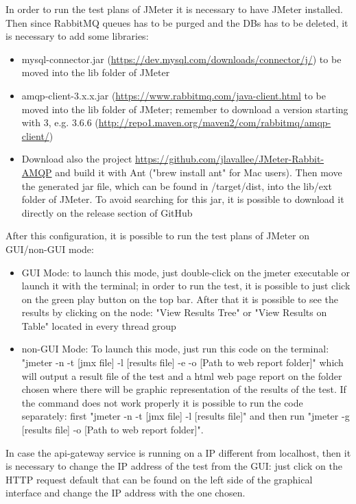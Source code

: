 \par
In order to run the test plans of JMeter it is necessary to have JMeter installed. Then since RabbitMQ queues has to be purged and the DBs has to be deleted, it is necessary to add some libraries:
\begin{itemize}
\item mysql-connector.jar (\url{https://dev.mysql.com/downloads/connector/j/}) to be moved into the lib folder of JMeter
\item amqp-client-3.x.x.jar (\url{https://www.rabbitmq.com/java-client.html} to be moved into the lib folder of JMeter; remember to download a version starting with 3, e.g. 3.6.6 (\url{http://repo1.maven.org/maven2/com/rabbitmq/amqp-client/})
\item Download also the project \url{https://github.com/jlavallee/JMeter-Rabbit-AMQP} and build it with Ant ("brew install ant" for Mac users). Then move the generated jar file, which can be found in /target/dist, into the lib/ext folder of JMeter. To avoid searching for this jar, it is possible to download it directly on the release section of GitHub
\end{itemize}
After this configuration, it is possible to run the test plans of JMeter on GUI/non-GUI mode: 
\begin{itemize}
	\item GUI Mode: to launch this mode, just double-click on the jmeter executable or launch it with the terminal; in order to run the test, it is possible to just click on the green play button on the top bar. After that it is possible to see the results by clicking on the node: "View Results Tree" or "View Results on Table" located in every thread group
	\item non-GUI Mode: To launch this mode, just run this code on the terminal: "jmeter -n -t [jmx file] -l [results file] -e -o [Path to web report folder]" which will output a result file of the test and a html web page report on the folder chosen where there will be graphic representation of the results of the test. If the command does not work properly it is possible to run the code separately: first "jmeter -n -t [jmx file] -l [results file]" and then run "jmeter -g [results file] -o [Path to web report folder]".
\end{itemize}
In case the api-gateway service is running on a IP different from localhost, then it is necessary to change the IP address of the test from the GUI: just click on the HTTP 
request default that can be found on the left side of the graphical interface and change the IP address with the one chosen.


